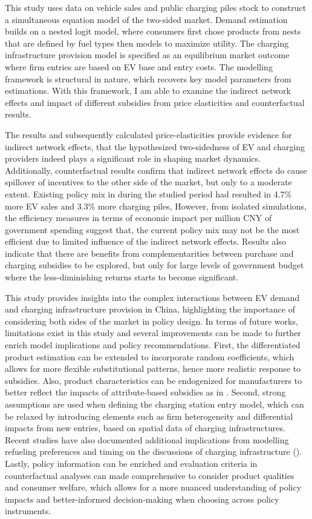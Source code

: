\documentclass[12pt]{article}
\begin{document}
This study uses data on vehicle sales and public charging piles stock to construct a simultaneous equation model of the two-sided market.
Demand estimation builds on a nested logit model, where consumers first chose products from nests that are defined by fuel types then models to maximize utility.
The charging infrastructure provision model is specified as an equilibrium market outcome where firm entries are based on EV base and entry costs.
The modelling framework is structural in nature, which recovers key model parameters from estimations.
With this framework, I am able to examine the indirect network effects and impact of different subsidies from price elasticities and counterfactual results.

The results and subsequently calculated price-elasticities provide evidence for indirect network effects, 
that the hypothesized two-sidedness of EV and charging providers indeed plays a significant role in shaping market dynamics.
Additionally, counterfactual results confirm that indirect network effects do cause spillover of incentives to the other side of the market, but only to a moderate extent.
Existing policy mix in during the studied period had resulted in 4.7\% more EV sales and 3.3\% more charging piles,
However, from isolated simulations, the efficiency measures in terms of economic impact per million CNY of government spending suggest that,
the current policy mix may not be the most efficient due to limited influence of the indirect network effects.
Results also indicate that there are benefits from complementarities between purchase and charging subsidies to be explored,
but only for large levels of government budget where the less-diminishing returns starts to become significant.

This study provides insights into the complex interactions between EV demand and charging infrastructure provision in China, 
highlighting the importance of considering both sides of the market in policy design. 
In terms of future works, limitations exist in this study and several improvements can be made to further enrich model implications and policy recommendations.
First, the differentiated product estimation can be extended to incorporate random coefficients, which allows for more flexible substitutional patterns, hence more realistic response to subsidies.
Also, product characteristics can be endogenized for manufacturers to better reflect the impacts of attribute-based subsidies as in \citet{barwick_attribute-based_2024}.
Second, strong assumptions are used when defining the charging station entry model, which can be relaxed by introducing elements such as firm heterogeneity and differential impacts from new entries,
based on spatial data of charging infrastructures. Recent studies have also documented additional implications from modelling refueling preferences and timing on the discussions of charging infrastructure (\citep{heid_equilibrium_2024,dorsey_fueling_2025}). 
Lastly, policy information can be enriched and evaluation criteria in counterfactual analyses can made comprehensive to consider product qualities and consumer welfare,
which allows for a more nuanced understanding of policy impacts and better-informed decision-making when choosing across policy instruments.

\newpage

\end{document}
